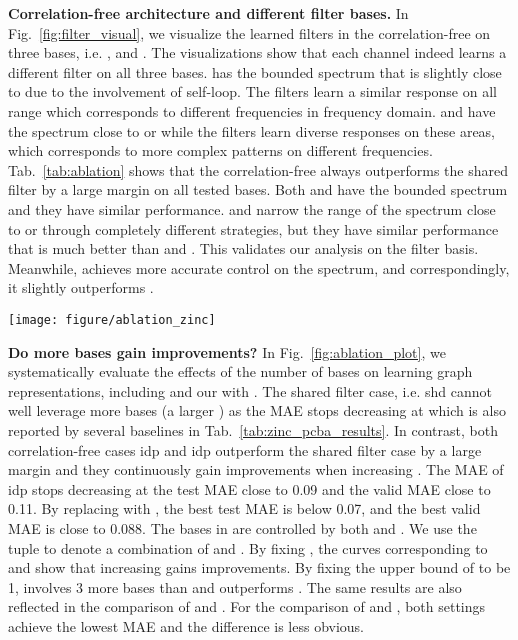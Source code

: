 \documentclass[nohyperref]{article}
\theoremstyle{plain}
\theoremstyle{definition}
\theoremstyle{remark}
\begin{document}
\textbf{Correlation-free architecture and different filter bases.}
In Fig.~\ref{fig:filter_visual}, we visualize the learned filters in the correlation-free on three bases, i.e. ,  and .
The visualizations show that each channel indeed learns a different filter on all three bases.
 has the bounded spectrum  that is slightly close to  due to the involvement of self-loop.
The filters learn a similar response on all range which corresponds to different frequencies in frequency domain.
 and  have the spectrum close to  or  while the filters learn diverse responses on these areas, which corresponds to more complex patterns on different frequencies.
Tab.~\ref{tab:ablation} shows that the correlation-free always outperforms the shared filter by a large margin on all tested bases.
Both  and  have the bounded spectrum  and they have similar performance.
 and  narrow the range of the spectrum close to  or  through completely different strategies, but they have similar performance that is much better than  and .
This validates our analysis on the filter basis.
Meanwhile,  achieves more accurate control on the spectrum, and correspondingly, it slightly outperforms .

\begin{figure*}[h]
	\centering
	\texttt{[image: figure/ablation\_zinc]}
	\vspace{-10pt}
	\caption{Ablation study results on ZINC with different number of bases .}
	\label{fig:ablation_plot}
	\vspace{-10pt}
\end{figure*}

\textbf{Do more bases gain improvements?}
In Fig.~\ref{fig:ablation_plot}, we systematically evaluate the effects of the number of bases on learning graph representations, including  and our  with .
The shared filter case, i.e. shd cannot well leverage more bases (a larger ) as the MAE stops decreasing at  which is also reported by several baselines in Tab.~\ref{tab:zinc_pcba_results}.
In contrast, both correlation-free cases idp and idp outperform the shared filter case by a large margin and they continuously gain improvements when increasing .
The MAE of idp stops decreasing at the test MAE close to 0.09 and the valid MAE close to 0.11.
By replacing  with , the best test MAE is below 0.07, and the best valid MAE is close to 0.088.
The bases in  are controlled by both  and .
We use the tuple  to denote a combination of  and .
By fixing , the curves corresponding to  and  show that increasing  gains improvements.
By fixing the upper bound of  to be 1,  involves 3 more bases than  and outperforms .
The same results are also reflected in the comparison of  and .
For the comparison of  and , both settings achieve the lowest MAE and the difference is less obvious.
\end{document}
